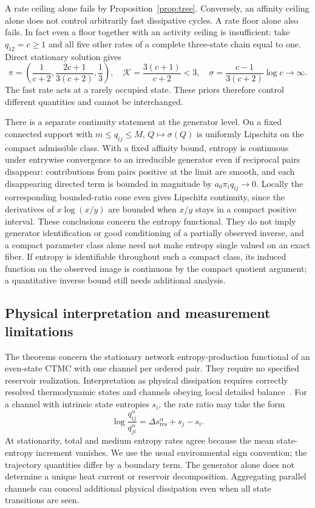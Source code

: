 \documentclass[aps,pre,onecolumn,11pt,longbibliography,notitlepage]{revtex4-2}
\newcommand{\1}{\mathbf 1}
\newcommand{\sig}{\sigma}
\begin{document}
A rate ceiling alone fails by Proposition~\ref{prop:tree}. Conversely, an
affinity ceiling alone does not control arbitrarily fast dissipative
cycles. A rate floor alone also fails. In fact even a floor together with
an activity ceiling is insufficient: take $q_{12}=c\ge1$ and all five
other rates of a complete three-state chain equal to one. Direct
stationary solution gives
\begin{equation}
 \pi=\left(\frac1{c+2},\frac{2c+1}{3(c+2)},\frac13\right),\quad
 \mathcal K=\frac{3(c+1)}{c+2}<3,\quad
 \sig=\frac{c-1}{3(c+2)}\log c\longrightarrow\infty.
\end{equation}
The fast rate acts at a rarely occupied state. These priors therefore
control different quantities and cannot be interchanged.

There is a separate continuity statement at the generator level. On a
fixed connected support with $m\le q_{ij}\le M$, $Q\mapsto\sig(Q)$ is
uniformly Lipschitz on the compact admissible class. With a fixed
affinity bound, entropy is continuous under entrywise convergence to an
irreducible generator even if reciprocal pairs disappear: contributions
from pairs positive at the limit are smooth, and each disappearing
directed term is bounded in magnitude by $a_0\pi_iq_{ij}\to0$.
Locally the corresponding bounded-ratio cone even gives Lipschitz
continuity, since the derivatives of $x\log(x/y)$ are bounded when
$x/y$ stays in a compact positive interval. These conclusions concern
the entropy functional. They do not imply generator identification or
good conditioning of a partially observed inverse, and a compact
parameter class alone need not make entropy single valued on an exact
fiber. If entropy is identifiable throughout such a compact class, its
induced function on the observed image is continuous by the compact
quotient argument; a quantitative inverse bound still needs additional
analysis.



\subsection{Physical interpretation and measurement limitations}
The theorems concern the stationary network entropy-production
functional of an even-state CTMC with one channel per ordered pair.
They require no specified reservoir realization. Interpretation as
physical dissipation requires correctly resolved thermodynamic states
and channels obeying local detailed balance~\cite{Esposito2012}.
For a channel with intrinsic state entropies $s_i$, the rate ratio may
take the form
\begin{equation}
 \log\frac{q_{ij}^{\alpha}}{q_{ji}^{\alpha}}
 =\Delta s_{\mathrm{res}}^{\alpha}+s_j-s_i.
\end{equation}
At stationarity, total and medium entropy rates agree because the mean
state-entropy increment vanishes. We use the usual environmental sign
convention; the trajectory quantities differ by a boundary term.
The generator alone does not determine a unique heat current or
reservoir decomposition. Aggregating parallel channels can conceal
additional physical dissipation even when all state transitions are seen.
\end{document}
